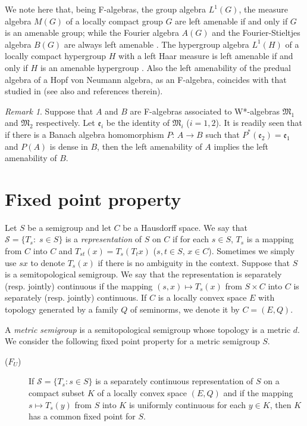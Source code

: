 \documentclass{tran-l}
\numberwithin{equation}{section}
\theoremstyle{definition}
\theoremstyle{remark}
\newtheorem{remark}[thm]{Remark}
\begin{document}
We note here that, being F-algebras, the group algebra $L^1(G)$, the measure algebra $M(G)$ of a locally compact group $G$ are left amenable if and only if $G$ is an amenable group; while the Fourier algebra $A(G)$ and the Fourier-Stieltjes algebra $B(G)$ are always left amenable \cite{Lau_F}. The hypergroup algebra $L^1(H)$ of a locally compact hypergroup $H$ with a left Haar measure is left amenable if and only if $H$ is an amenable hypergroup \cite{Skan}. Also the left amenability of the predual algebra of a Hopf von Neumann algebra, as an F-algebra, coincides with that studied in \cite{Ruan, Voic} (see also \cite{B-T} and references therein).

\begin{remark}
Suppose that $A$ and $B$ are F-algebras associated to W*-algebras ${\mathfrak{M}}_1$ and ${\mathfrak{M}}_2$ respectively. Let ${\mathfrak{e}}_i$ be the identity of ${\mathfrak{M}}_i$ ($i=1,2$). It is readily seen that if there is a Banach algebra homomorphism $P$: $A\to B$ such that $P^*({\mathfrak{e}}_2) = {\mathfrak{e}}_1$ and $P(A)$ is dense in $B$, then the left amenability of $A$ implies the left amenability of $B$.
\end{remark}

\section{Fixed point property}\label{sec 3}

Let $S$ be a semigroup and let $C$ be a Hausdorff space. We say that ${\mathcal{S}} = \{T_s:\; s\in S\}$ is a \emph{representation} of $S$ on $C$ if for each $s\in S$, $T_s$ is a mapping from $C$ into $C$ and $T_{st}(x) = T_s(T_tx)$ ($s,t\in S$, $x\in C$). Sometimes we simply use $sx$ to denote $T_s(x)$ if there is no ambiguity in the context. Suppose that $S$ is a semitopological semigroup. We say that the representation is separately (resp. jointly) continuous if the mapping $(s,x) \mapsto T_s(x)$ from $S\times C$ into $C$ is separately (resp. jointly) continuous. If $C$ is a locally convex space $E$ with topology generated by a family $Q$ of seminorms, we denote it by $C=(E,Q)$.

A \emph{metric semigroup} is a semitopological semigroup whose topology is a metric $d$. We consider the following fixed point property for a metric semigroup $S$.

\begin{description}
\item[($F_U$)] If $ {\mathcal{S}} = \{T_s: s\in S\}$ is a separately continuous representation of $S$ on a compact subset $K$ of a locally convex space $(E,Q)$ and if the mapping $s\mapsto T_s(y)$ from $S$ into $K$ is uniformly continuous for each $y\in K$, then $K$ has a common fixed point for $S$.\label{FU}
\end{description}
\end{document}
